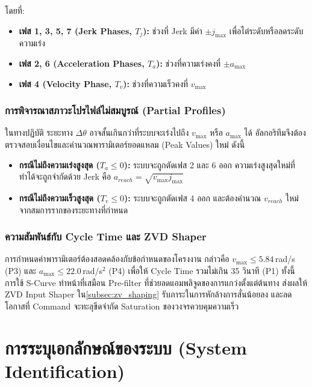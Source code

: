 \noindent โดยที่:
\begin{itemize}
    \item \textbf{เฟส 1, 3, 5, 7 (Jerk Phases, $T_j$):} ช่วงที่ Jerk มีค่า $\pm j_{\max}$ เพื่อไต่ระดับหรือลดระดับความเร่ง
    \item \textbf{เฟส 2, 6 (Acceleration Phases, $T_a$):} ช่วงที่ความเร่งคงที่ $\pm a_{\max}$
    \item \textbf{เฟส 4 (Velocity Phase, $T_v$):} ช่วงที่ความเร็วคงที่ $v_{\max}$
\end{itemize}

\subsubsection{การพิจารณาสภาวะโปรไฟล์ไม่สมบูรณ์ (Partial Profiles)}

ในทางปฏิบัติ ระยะทาง $\Delta\theta$ อาจสั้นเกินกว่าที่ระบบจะเร่งไปถึง $v_{\max}$ หรือ $a_{\max}$ ได้ อัลกอริทึมจึงต้องตรวจสอบเงื่อนไขและคำนวณพารามิเตอร์ยอดแหลม (Peak Values) ใหม่ ดังนี้

\begin{itemize}
    \item \textbf{กรณีไม่ถึงความเร่งสูงสุด ($T_a \leq 0$):} ระบบจะถูกตัดเฟส 2 และ 6 ออก ความเร่งสูงสุดใหม่ที่ทำได้จะถูกจำกัดด้วย Jerk คือ $a_{reach} = \sqrt{v_{\max} j_{\max}}$
    \item \textbf{กรณีไม่ถึงความเร็วสูงสุด ($T_v \leq 0$):} ระบบจะถูกตัดเฟส 4 ออก และต้องคำนวณ $v_{reach}$ ใหม่จากสมการรากของระยะทางที่กำหนด
\end{itemize}

\subsubsection{ความสัมพันธ์กับ Cycle Time และ ZVD Shaper}

การกำหนดค่าพารามิเตอร์ต้องสอดคล้องกับข้อกำหนดของโครงงาน กล่าวคือ $v_{\max} \leq 5.84$\,rad/s (P3) และ $a_{\max} \leq 22.0$\,rad/s$^2$ (P4) เพื่อให้ Cycle Time รวมไม่เกิน 35 วินาที (P1)
ทั้งนี้ การใช้ S-Curve ทำหน้าที่เสมือน Pre-filter ที่ช่วยลดแอมพลิจูดของการแกว่งตั้งแต่ต้นทาง ส่งผลให้ ZVD Input Shaper ใน\cref{subsec:zv_shaping} รับภาระในการหักล้างการสั่นน้อยลง และลดโอกาสที่ Command จะทะลุขีดจำกัด Saturation ของวงจรควบคุมความเร็ว
\section{การระบุเอกลักษณ์ของระบบ (System Identification)}
\label{sec:system_id}


